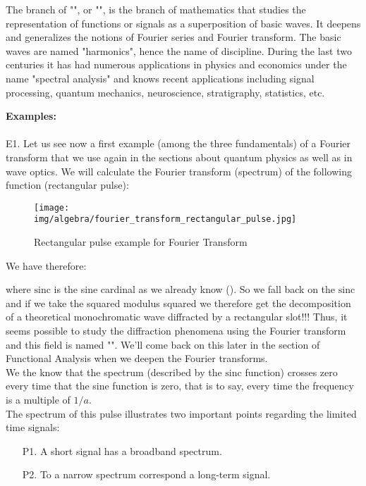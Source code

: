	\begin{tcolorbox}[title=Remark,colframe=black,arc=10pt]
	The branch of "", or "", is the branch of mathematics that studies the representation of functions or signals as a superposition of basic waves. It deepens and generalizes the notions of Fourier series and Fourier transform. The basic waves are named "harmonics", hence the name of discipline. During the last two centuries it has had numerous applications in physics and economics under the name "spectral analysis" and knows recent applications including signal processing, quantum mechanics, neuroscience, stratigraphy, statistics, etc.
	\end{tcolorbox}
	\begin{tcolorbox}[colframe=black,colback=white,sharp corners]
	\textbf{{\Large {}}Examples:}\\\\
	E1. Let us see now a first example (among the three fundamentals) of a Fourier transform that we use again in the sections about quantum physics as well as in wave optics. We will calculate the Fourier transform (spectrum) of the following function (rectangular pulse):
	\begin{figure}[H]
		\centering
		\texttt{[image: img/algebra/fourier\_transform\_rectangular\_pulse.jpg]}
		\caption{Rectangular pulse example for Fourier Transform}
	\end{figure}
	We have therefore:
	
	where $\text{sinc}$ is the sine cardinal as we already know (). So we fall back on the $\text{sinc}$ and if we take the squared modulus squared we therefore get the decomposition of a theoretical monochromatic wave diffracted by a rectangular slot!!! Thus, it seems possible to study the diffraction phenomena using the Fourier transform and this field is named "". We'll come back on this later in the section of Functional Analysis when we deepen the Fourier transforms.\\
	
	We the know that the spectrum (described by the $\text{sinc}$ function) crosses zero every time that the sine function is zero, that is to say, every time the frequency is a multiple of $1 / a$.\\
	
	The spectrum of this pulse illustrates two important points regarding the limited time signals:
	\begin{enumerate}
		\item[P1.] A short signal has a broadband spectrum.
		\item[P2.] To a narrow spectrum correspond a long-term signal.
	\end{enumerate}
	\end{tcolorbox}

